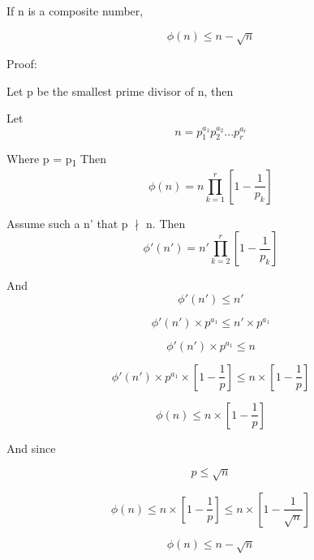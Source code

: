 \documentclass{article}
\begin{document}
If n is a composite number, 

\[
    \phi(n) \leq n - \sqrt{n}
\]

Proof:

Let p be the smallest prime divisor of n, then 

Let
\[
    n = p_1^{a_1} p_2^{a_2} . . . p_r^{a_r}
\]

Where p = p\textsubscript{1}
Then
\[
    \phi(n) = n \prod_{k=1}^{r} [1 - \frac{1}{p_k}]
\]

Assume such a n' that p \(\nmid\) n.
Then
\[
    \phi'(n') = n' \prod_{k=2}^{r} [1 - \frac{1}{p_k}]
\]

And
\[
    \phi'(n') \leq n'
\]

\[
    \phi'(n') \times p^{a_1} \leq n' \times p^{a_1}
\]

\[
    \phi'(n') \times p^{a_1} \leq n
\]

\[
    \phi'(n') \times p^{a_1} \times [1 - \frac{1}{p}] \leq n \times [1 - \frac{1}{p}]
\]

\[
    \phi(n) \leq  n \times [1 - \frac{1}{p}]
\]

And since 

\[
    p \leq \sqrt{n}
\]

\[
    \phi(n) \leq  n \times [1 - \frac{1}{p}] \leq n \times [1 - \frac{1}{\sqrt{n}}]
\]

\[
    \phi(n) \leq n - \sqrt{n}
\]
\end{document}
